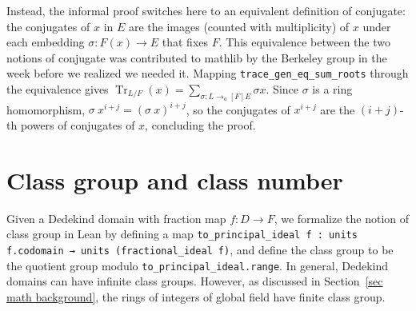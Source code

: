 \documentclass[a4paper,USenglish,cleveref, autoref, thm-restate]{lipics-v2021}
\newcommand{\lean}[1]{\texttt{#1}\xspace} %
\DeclareMathOperator{\Tr}{Tr}
\newcommand{\mathlib}{\textsf{mathlib}\xspace}
\begin{document}
Instead, the informal proof switches here to an equivalent definition of conjugate:
the conjugates of $x$ in $E$ are the images (counted with multiplicity) of $x$ under each embedding $\sigma \colon F(x) \to E$ that fixes $F$. This equivalence between the two notions of conjugate was contributed to \mathlib by the Berkeley group in the week before we realized we needed it. Mapping \lean{trace\_gen\_eq\_sum\_roots} through the equivalence gives
$\Tr_{L / F}(x) = \sum_{σ : L \to_a[F] E} \sigma x$.
Since $\sigma$ is a ring homomorphism, $\sigma\ x^{i + j} = (\sigma\ x)^{i + j}$,
so the conjugates of $x^{i + j}$ are the $(i + j)$-th powers of conjugates of $x$, concluding the proof.

\section{Class group and class number} \label{sec:class-number}

Given a Dedekind domain with fraction map $f\colon D\to F$, we formalize the notion of class group in Lean by defining a map \lean{to\_principal\_ideal f : units f.codomain → units (fractional\_ideal f)}, %
and define the class group to be the quotient group modulo \lean{to\_principal\_ideal.range}.
In general, Dedekind domains can have infinite class groups. However, as discussed in Section~\ref{sec math background}, the rings of integers of global field have finite class group.
\end{document}
